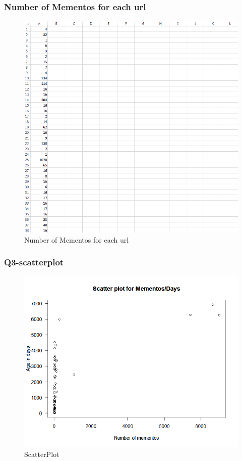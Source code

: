 \subsubsection{Number of Mementos for each url}
\begin{figure}[ht]    
    \begin{center}
        \includegraphics[scale=0.80]{num_mem.png}
        \caption{Number of Mementos for each url}
        \label{Number of Mementos for each url}
    \end{center}
\end{figure}
\newpage

\subsubsection{Q3-scatterplot}
\begin{figure}[ht]    
    \begin{center}
        \includegraphics[scale=0.60]{scatter_age_mementos.png}
        \caption{ScatterPlot}
        \label{scatterPlot}
    \end{center}
\end{figure}